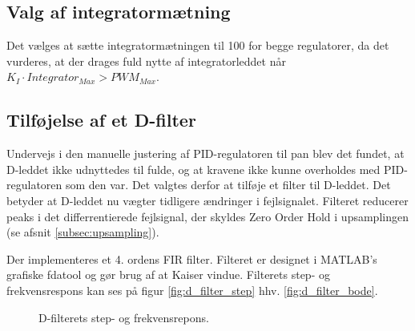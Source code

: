 \subsection{Valg af integratormætning}
Det vælges at sætte integratormætningen til 100 for begge regulatorer, da det vurderes, at der drages
fuld nytte af integratorleddet når \( K_I \cdot Integrator_{Max} > PWM_{Max} \).

\subsection{Tilføjelse af et D-filter}
Undervejs i den manuelle justering af PID-regulatoren til pan blev det fundet, at D-leddet ikke udnyttedes til fulde,
og at kravene ikke kunne overholdes med PID-regulatoren som den var.
Det valgtes derfor at tilføje et filter til D-leddet. 
Det betyder at D-leddet nu vægter tidligere ændringer i fejlsignalet. 
Filteret reducerer peaks i det differrentierede fejlsignal, der skyldes Zero Order Hold i upsamplingen (se afsnit \ref{subsec:upsampling}).

Der implementeres et 4. ordens FIR filter. Filteret er designet i MATLAB's grafiske fdatool og gør brug af at Kaiser vindue.
Filterets step- og frekvensrespons kan ses på figur \ref{fig:d_filter_step} hhv. \ref{fig:d_filter_bode}. 

\begin{figure}[h!]
\centering
{}
\caption[D-filterets respons]{D-filterets step- og frekvensrepons.}
\label{fig:d_filter}
\end{figure}

